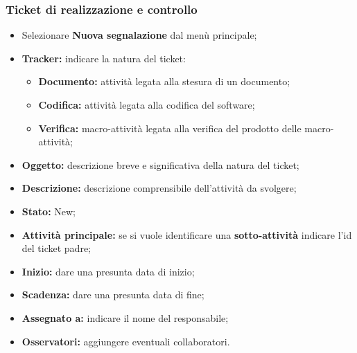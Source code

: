       \subsubsection{Ticket di realizzazione e controllo}
        \begin{itemize}
          \item Selezionare \textbf{Nuova segnalazione} dal menù principale;
          \item \textbf{Tracker: }indicare la natura del ticket:
          \bgroup
            \begin{itemize}
              \item \textbf{Documento: }attività legata alla stesura di un documento;
              \item \textbf{Codifica: }attività legata alla  codifica del software;
              \item \textbf{Verifica: }macro-attività legata alla verifica del prodotto delle macro-attività;
            \end{itemize}
          \egroup
            \item \textbf{Oggetto: }descrizione breve e significativa della natura del ticket;
          \item \textbf{Descrizione: }descrizione comprensibile dell'attività da svolgere;
          \item \textbf{Stato: }New;
          \item \textbf{Attività principale: }se si vuole identificare una \textbf{sotto-attività} indicare l'id del ticket padre;
          \item \textbf{Inizio: }dare una presunta data di inizio;
          \item \textbf{Scadenza: }dare una presunta data di fine;
          \item \textbf{Assegnato a: }indicare il nome del responsabile;
          \item \textbf{Osservatori: }aggiungere eventuali collaboratori.
        \end{itemize}
